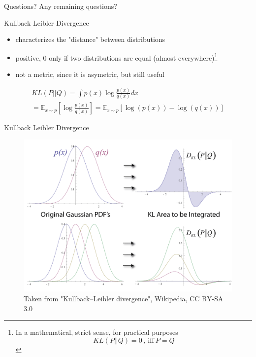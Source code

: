 \documentclass[10pt]{beamer}
\begin{document}
\begin{frame}[standout]{Questions?}
    Any remaining questions?
\end{frame}

\appendix

\begin{frame}{Kullback Leibler Divergence}
    \begin{itemize}
        \item characterizes the "distance" between distributions
        \item positive, 0 only if two distributions are equal (almost everywhere)\footnote{In a mathematical, strict sense, for practical purposes $$KL(P||Q)  = 0~\text{, iff}~ P = Q$$}
        \item not a metric, since it is asymetric, but still useful
    \end{itemize}
    \begin{gather}
        KL(P||Q) = \int p(x) \log\frac{p(x)}{q(x)}dx\\
        = \mathbb{E}_{x\sim p}[\log\frac{p(x)}{q(x)}] = \mathbb{E}_{x\sim p}[\log(p(x)) - \log(q(x))]
    \end{gather}
\end{frame}

\begin{frame}{Kullback Leibler Divergence}
    \begin{center}
        \begin{figure}
            \includegraphics[height=0.8\textheight]{figs/kl.png}
            \caption{Taken from "Kullback–Leibler divergence", Wikipedia, CC BY-SA 3.0}
        \end{figure}
    \end{center}
\end{frame}
\end{document}
